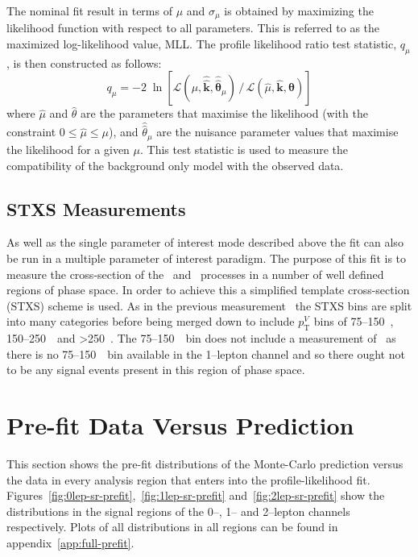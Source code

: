 The nominal fit result in terms of $\mu$ and $\sigma_{\mu}$ is obtained by
maximizing the likelihood function with respect to all parameters. This is
referred to as the maximized log-likelihood value, MLL. The profile likelihood
ratio test statistic, $q_\mu$, is then constructed as follows:
\begin{equation} q_\mu = - 2\; \ln \left[ \mathcal{L} (\mu,
\hat{\hat{\mathbf{k}}}, \hat{\hat{\bm\theta}}_{\mu})\, / \, \mathcal{L}
(\hat{\mu}, \hat{\mathbf{k}}, \hat{\bm\theta}) \right]
\end{equation} where $\hat{\mu}$ and $\hat{\theta}$ are the parameters that
maximise the likelihood (with the constraint $0 \leq \hat{\mu} \leq \mu$), and
$\hat{\hat{\theta}}_\mu$ are the nuisance parameter values that maximise the
likelihood for a given $\mu$. This test statistic is used to measure the
compatibility of the background only model with the observed data.

\subsection{STXS Measurements}

As well as the single parameter of interest mode described above the fit can
also be run in a multiple parameter of interest paradigm. The purpose of this
fit is to measure the cross-section of the \WH\ and \ZH\ processes in a number
of well defined regions of phase space. In order to achieve this a simplified
template cross-section (STXS) scheme is used. As in the previous
measurement~\cite{STXSpaper} the STXS bins are split into many categories before
being merged down to include $p_{\mathrm{T}}^V$ bins of 75--150~\GeV,
150--250~\GeV\ and >250~\GeV. The 75--150~\GeV\ bin does not include a
measurement of \WH\ as there is no 75--150~\GeV\ bin available in the 1--lepton
channel and so there ought not to be any signal events present in this region of
phase space.

\section{Pre-fit Data Versus Prediction}
\label{sec:prefit}

This section shows the pre-fit distributions of the Monte-Carlo prediction
versus the data in every analysis region that enters into the profile-likelihood
fit. Figures~\ref{fig:0lep-sr-prefit},~\ref{fig:1lep-sr-prefit}
and~\ref{fig:2lep-sr-prefit} show the distributions in the signal regions of the
0--, 1-- and 2--lepton channels respectively. Plots of all distributions in all
regions can be found in appendix~\ref{app:full-prefit}.

\clearpage
\newpage

